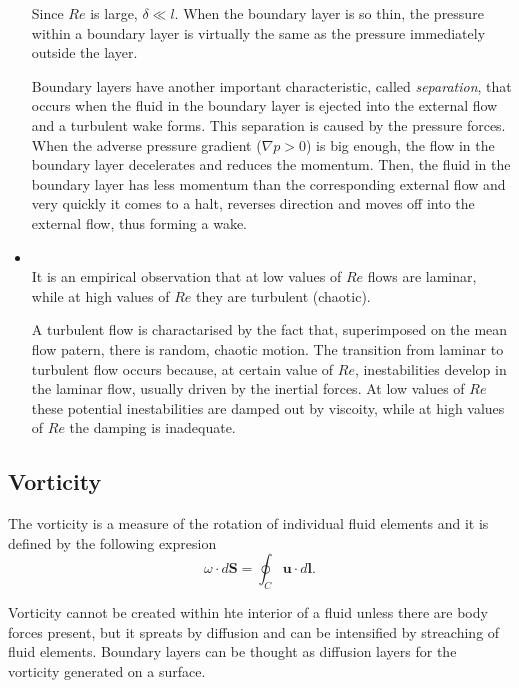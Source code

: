 \begin{itemize}
Since $Re$ is large, $\delta\ll l.$ When the boundary layer is so thin, the pressure within a boundary layer is virtually the same as the pressure immediately outside the layer.

Boundary layers have another important characteristic, called \textit{separation}, that occurs when the fluid in the boundary layer is ejected into the external flow and a turbulent wake forms. This separation is caused by the pressure forces. When the adverse pressure gradient ($\nabla p>0$) is big enough, the flow in the boundary layer decelerates and reduces the momentum. Then, the fluid in the boundary layer has less momentum than the corresponding external flow and very quickly it comes to a halt, reverses direction and moves off into the external flow, thus forming a wake.

\item{}\\It is an empirical observation that at low values of $Re$ flows are laminar, while at high values of $Re$ they are turbulent (chaotic).

A turbulent flow is charactarised by the fact that, superimposed on the mean flow patern, there is random, chaotic motion. The transition from laminar to turbulent flow occurs because, at certain value of $Re$, inestabilities develop in the laminar flow, usually driven by the inertial forces. At low values of $Re$ these potential inestabilities are damped out by viscoity, while at high values of $Re$ the damping is inadequate.

\end{itemize}

\subsection{Vorticity}
The vorticity is a measure of the rotation of individual fluid elements and it is defined by the following expresion
$$\omega\cdot d\mathbf{S}=\oint_C\mathbf{u}\cdot d\mathbf{l}.$$

Vorticity cannot be created within hte interior of a fluid unless there are body forces present, but it spreats by diffusion and can be intensified by streaching of fluid elements. Boundary layers can be thought as diffusion layers for the vorticity generated on a surface.

